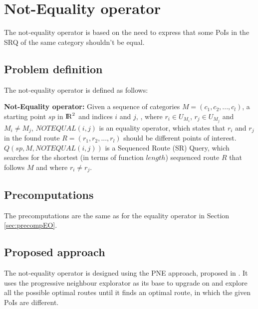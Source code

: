 

\section{Not-Equality operator}
The not-equality operator is based on the need to express that some PoIs in the SRQ of the same category shouldn't be equal.

\subsection{Problem definition} 
\label{sec:problemNEO}
The not-equality operator is defined as follows: \newline

\textbf{Not-Equality operator:} Given a sequence of categories $M = (c_1, c_2, ..., c_l)$, a starting point $sp$ in ${\rm I\!R}^2$ and indices $i$ and $j$, , where $r_i \in U_{M_{i}}$, $r_j \in U_{M_{j}}$ and $M_i \neq M_j$, $NOTEQUAL(i, j)$ is an equality operator, which states that $r_i$ and $r_j$ in the found route $R = (r_1, r_2, ..., r_l)$ should be different points of interest.
$Q(sp, M, NOTEQUAL(i, j))$ is a Sequenced Route (SR) Query, which searches for the shortest (in terms of function $length$) sequenced route $R$ that follows $M$ and where $r_i \neq r_j$.

\subsection{Precomputations} 
\label{sec:precompNEO}
The precomputations are the same as for the equality operator in Section \ref{sec:precompEO}.

\subsection{Proposed approach} 
\label{sec:approachNEO}
The not-equality operator is designed using the PNE approach, proposed in \cite{OSR}. It uses the progressive neighbour explorator as its base to upgrade on and explore all the possible optimal routes until it finds an optimal route, in which the given PoIs are different.

